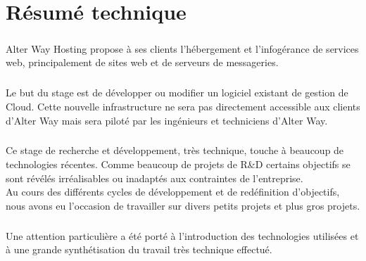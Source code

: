 \chapter*{Résumé technique}
\paragraph*{}
	Alter Way Hosting propose à ses clients l'hébergement et l'infogérance de
	services web, principalement de sites web et de serveurs de messageries.

\paragraph*{}
	Le but du stage est de développer ou modifier un logiciel existant de gestion
	de Cloud. Cette nouvelle infrastructure ne sera pas directement accessible
	aux clients d'Alter Way mais sera piloté par les ingénieurs et techniciens
	d'Alter Way.

\paragraph*{}
	Ce stage de recherche et développement, très technique, touche à beaucoup de technologies récentes.
	Comme beaucoup de projets de R\&D certains objectifs se sont révélés irréalisables ou inadaptés aux contraintes
	de l'entreprise.\\
	Au cours des différents cycles de développement et de redéfinition d'objectifs, nous avons eu l'occasion de travailler
	sur divers petits projets et plus gros projets.

\paragraph*{}
	Une attention particulière a été porté à l'introduction des technologies utilisées et à une grande synthétisation du
	travail très technique effectué.

